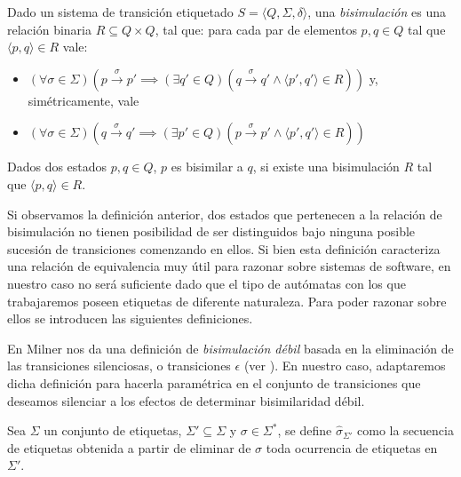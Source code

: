 \begin{definition} \label{def:bisimulación} Dado un sistema de transición etiquetado $ S = \langle Q, \Sigma, \delta \rangle $, una \emph{bisimulación} es una relación binaria $R \subseteq Q \times Q$, tal que: para cada par de elementos $p, q \in Q$ tal que $\langle p, q \rangle \in R$ vale:
\begin{itemize}
    \item $(\forall \sigma \in \Sigma)(p \xrightarrow{\sigma} p' \implies (\exists q' \in Q)(q \xrightarrow{\sigma} q' \land \langle p', q' \rangle \in R))$ y, simétricamente, vale 
    \item $(\forall \sigma \in \Sigma)(q \xrightarrow{\sigma} q' \implies (\exists p' \in Q)(p \xrightarrow{\sigma} p' \land \langle p', q' \rangle \in R))$
\end{itemize}
Dados dos estados $p, q \in Q $, $p$ es bisimilar a $q$, si existe una bisimulación $R$ tal que $\langle p, q \rangle \in R$.
\end{definition}

Si observamos la definición anterior, dos estados que pertenecen a la relación de bisimulación no tienen posibilidad de ser distinguidos bajo ninguna posible sucesión de transiciones comenzando en ellos. Si bien esta definición caracteriza una relación de equivalencia muy útil para razonar sobre sistemas de software, en nuestro caso no será suficiente dado que el tipo de autómatas con los que trabajaremos poseen etiquetas de diferente naturaleza. Para poder razonar sobre ellos se introducen las siguientes definiciones.

En \cite[Sec.~5.1, Def.~5]{milner89} Milner nos da una definición de \emph{bisimulación débil} basada en la eliminación de las transiciones silenciosas, o transiciones $\epsilon$ (ver \cite[Defs.~1 a~4]{milner89}). En nuestro caso, adaptaremos dicha definición para hacerla paramétrica en el conjunto de transiciones que deseamos silenciar a los efectos de determinar bisimilaridad débil.

\begin{definition}
Sea $\Sigma$ un conjunto de etiquetas, $\Sigma' \subseteq \Sigma$ y $\sigma \in \Sigma^*$, se define $\widehat{\sigma}_{\Sigma'}$ como la secuencia de etiquetas obtenida a partir de eliminar de $\sigma$ toda ocurrencia de etiquetas en $\Sigma'$.
\end{definition}

